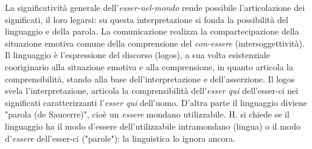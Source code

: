 \documentclass[a4paper,12pt,oneside]{article}%
\begin{document}
La significatività generale dell'\textit{esser-nel-mondo} rende possibile l'articolazione dei significati, il loro legarsi: su questa interpretazione si fonda la possibilità del linguaggio e della parola. La comunicazione realizza la compartecipazione della situazione emotiva comune della comprensione del \textit{con-essere} (intersoggettività). Il linguaggio  è l'espressione del discorso (logos), a sua volta esistenziale cooriginario alla situazione emotiva e alla comprensione, in quanto articola la comprensibilità, stando alla base dell'interpretazione e dell'asserzione. Il logos svela l'interpretazione, articola la comprensibilità dell'\textit{esser qui} dell'esser-ci nei significati caratterizzanti l'\textit{esser qui} dell'uomo. D'altra parte il linguaggio diviene "parola (de Saucerre)", cioè un \textit{essere} mondano utilizzabile. H. si chiede se il linguaggio ha il modo d'essere dell'utilizzabile intramondano (lingua) o il modo d'\textit{essere} dell'esser-ci ("parole"): la linguistica lo ignora ancora.
\end{document}

